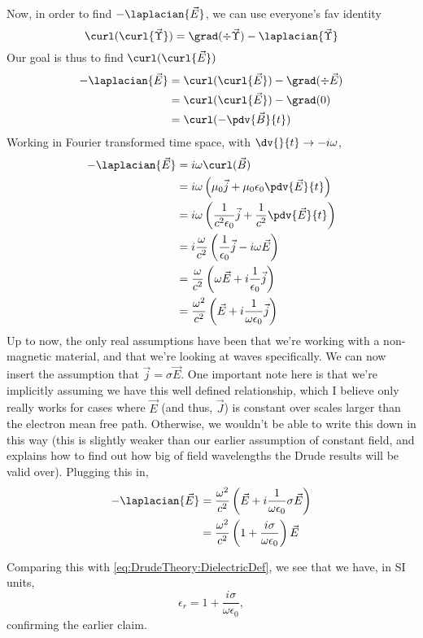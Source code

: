 \documentclass[../../main.tex]{subfiles}
\begin{document}
Now, in order to find $-\laplacian{\vec{E}}$, we can use everyone's fav identity
\begin{equation}
	\curl(\curl{\vec{\Upsilon}}) = \grad(\div{\vec{\Upsilon}}) - \laplacian{\vec{\Upsilon}}
\end{equation}
Our goal is thus to find $\curl(\curl{\vec{E}})$
\begin{align}
	 - \laplacian{\vec{E}} &= \curl(\curl{\vec{E}}) - \grad(\div{\vec{E}}) \\
	 &= \curl(\curl{\vec{E}}) - \grad(0) \\
	 &= \curl(- \pdv{\vec{B}}{t})
\end{align}
Working in Fourier transformed time space, with $\dv{}{t} \rightarrow -i \omega$, 
\begin{align}
	- \laplacian{\vec{E}} &= i\omega \curl(\vec{B}) \\ 
	&= i \omega \left(\mu_0 \vec{j} + \mu_0 \epsilon_0 \pdv{\vec{E}}{t} \right) \\
	&= i \omega \left(\frac{1}{c^2 \epsilon_0} \vec{j} + \frac{1}{c^2} \pdv{\vec{E}}{t} \right) \\ 
	&= i \frac{\omega}{c^2} \left(\frac{1}{\epsilon_0} \vec{j} - i\omega \vec{E} \right) \\
	&= \frac{\omega}{c^2} \left(\omega \vec{E} + i \frac{1}{\epsilon_0} \vec{j} \right) \\  
	&= \frac{\omega^2}{c^2} \left(\vec{E} + i \frac{1}{\omega \epsilon_0} \vec{j} \right)
\end{align}
Up to now, the only real assumptions have been that we're working with a non-magnetic material, and that we're looking at waves specifically. We can now insert the assumption that $\vec{j} = \sigma \vec{E}$. One important note here is that we're implicitly assuming we have this well defined relationship, which I believe only really works for cases where $\vec{E}$ (and thus, $\vec{J}$) is constant over scales larger than the electron mean free path. Otherwise, we wouldn't be able to write this down in this way (this is slightly weaker than our earlier assumption of constant field, and explains how to find out how big of field wavelengths the Drude results will be valid over). Plugging this in,
\begin{align}
	- \laplacian{\vec{E}} &= \frac{\omega^2}{c^2} \left(\vec{E} + i \frac{1}{\omega \epsilon_0} \sigma \vec{E} \right) \\
	&= \frac{\omega^2}{c^2} \left(1+ \frac{i \sigma}{\omega \epsilon_0} \right) \vec{E}
\end{align}

Comparing this with \eqref{eq:DrudeTheory:DielectricDef}, we see that we have, in SI units,
\begin{equation}
	\epsilon_r = 1 + \frac{i \sigma}{\omega \epsilon_0}, 
\end{equation}
confirming the earlier claim. 
\end{document}

